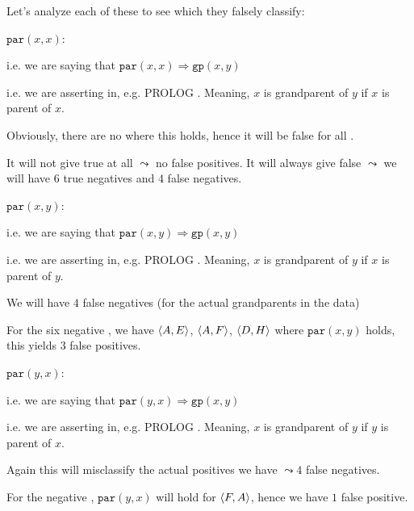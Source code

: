 Let's analyze each of these  to see which  they falsely classify:

$\texttt{par}(x,x)$:

i.e. we are saying that $\texttt{par}(x,x) \Rightarrow \texttt{gp}(x,y)$

i.e. we are asserting in, e.g. PROLOG . Meaning, $x$ is grandparent of $y$ if $x$ is parent of $x$. 

Obviously, there are no  where this holds, hence it will be false for all .

It will not give true at all $\leadsto$ no false positives. It will always give false $\leadsto$ we will have $6$ true negatives and $4$ false negatives.


$\texttt{par}(x,y)$:

i.e. we are saying that $\texttt{par}(x,y) \Rightarrow \texttt{gp}(x,y)$

i.e. we are asserting in, e.g. PROLOG . Meaning, $x$ is grandparent of $y$ if $x$ is parent of $y$. 

We will have $4$ false negatives (for the actual grandparents in the data)

For the six negative , we have $\left\langle A,E \right\rangle$, $\left\langle A,F \right\rangle$, $\left\langle D,H \right\rangle$ where $\texttt{par}(x,y)$ holds, this yields $3$ false positives.


$\texttt{par}(y,x)$:

i.e. we are saying that $\texttt{par}(y,x) \Rightarrow \texttt{gp}(x,y)$

i.e. we are asserting in, e.g. PROLOG . Meaning, $x$ is grandparent of $y$ if $y$ is parent of $x$. 

Again this will misclassify the actual positives we have $\leadsto 4$ false negatives. 

For the negative , $\texttt{par}(y,x)$ will hold for $\left\langle F,A \right\rangle$, hence we have $1$ false positive.



\noindent{}